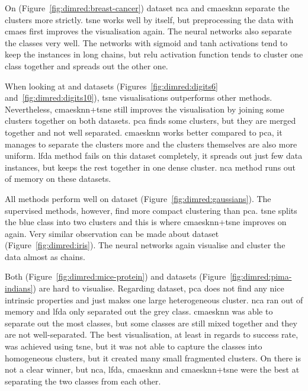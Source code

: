 \documentclass[12pt,a4paper]{report}
\begin{document}
On  (Figure~\ref{fig:dimred:breast-cancer}) dataset \ac{nca} and \ac{cmaesknn} separate the clusters more strictly. \ac{tsne} works well by itself, but preprocessing the data with \ac{cmaes} first improves the visualisation again. The neural networks also separate the classes very well. The networks with sigmoid and \ac{tanh} activations tend to keep the instances in long chains, but \ac{relu} activation function tends to cluster one class together and spreads out the other one.

When looking at  and  datasets (Figures~\ref{fig:dimred:digits6} and~\ref{fig:dimred:digits10}), \ac{tsne} visualisations outperforms other methods. Nevertheless, \ac{cmaesknn}+\ac{tsne} still improves the visualisation by joining some clusters together on both datasets. \ac{pca} finds some clusters, but they are merged together and not well separated. \ac{cmaesknn} works better compared to \ac{pca}, it manages to separate the clusters more and the clusters themselves are also more uniform. \ac{lfda} method fails on this dataset completely, it spreads out just few data instances, but keeps the rest together in one dense cluster. \ac{nca} method runs out of memory on these datasets.

All methods perform well on  dataset (Figure~\ref{fig:dimred:gaussians}). The supervised methods, however, find more compact clustering than \ac{pca}. \ac{tsne} splits the blue class into two clusters and this is where \ac{cmaesknn}+\ac{tsne} improves on again. Very similar observation can be made about  dataset (Figure~\ref{fig:dimred:iris}). The neural networks again visualise and cluster the data almost as chains.

Both  (Figure~\ref{fig:dimred:mice-protein}) and  datasets (Figure~\ref{fig:dimred:pima-indians}) are hard to visualise. Regarding  dataset, \ac{pca} does not find any nice intrinsic properties and just makes one large heterogeneous cluster. \ac{nca} ran out of memory and \ac{lfda} only separated out the grey class. \ac{cmaesknn} was able to separate out the most classes, but some classes are still mixed together and they are not well-separated. The best visualisation, at least in regards to success rate, was achieved using \ac{tsne}, but it was not able to capture the classes into homogeneous clusters, but it created many small fragmented clusters. On  there is not a clear winner, but \ac{nca}, \ac{lfda}, \ac{cmaesknn} and \ac{cmaesknn}+\ac{tsne} were the best at separating the two classes from each other.
\end{document}

